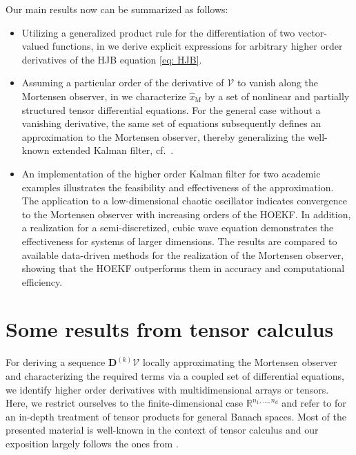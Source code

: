 \documentclass[11pt,reqno]{amsart}
\numberwithin{equation}{section}
\theoremstyle{plain}
\newcommand{\R}{\mathbb{R}}
\newcommand{\TenDeriv}[1]{\mathbf{D}^{(#1)}}
\begin{document}
Our main results now can be summarized as follows:
\begin{itemize}
    \item Utilizing a generalized product rule for the differentiation of two vector-valued functions, in  we derive explicit expressions for arbitrary higher order derivatives of the HJB equation \eqref{eq: HJB}.
    \item Assuming a particular order of the derivative of $\mathcal{V}$ to vanish along the Mortensen observer, in  we characterize $\widehat{x}_\mathrm{M}$ by a set of nonlinear and partially structured tensor differential equations. For the general case without a vanishing derivative, the same set of equations subsequently defines an approximation to the Mortensen observer, thereby generalizing the well-known extended Kalman filter, cf.~.
    \item An implementation of the higher order Kalman filter for two academic examples illustrates the feasibility and effectiveness of the approximation. The application to a low-dimensional chaotic oscillator indicates convergence to the Mortensen observer with increasing orders of the HOEKF. In addition, a realization for a semi-discretized, cubic wave equation demonstrates the effectiveness for systems of larger dimensions. The results are compared to available data-driven methods for the realization of the Mortensen observer, showing that the HOEKF outperforms them in accuracy and computational efficiency.  
\end{itemize}
%
\section{Some results from tensor calculus}
%
For deriving a sequence $\TenDeriv{k} \mathcal{V}$ locally approximating the Mortensen observer and characterizing the required terms via a coupled set of differential equations, we identify higher order derivatives with multidimensional arrays or tensors. Here, we restrict ourselves to the finite-dimensional case $\R^{n_1,\dots,n_d}$ and refer to \cite{Hac19} for an in-depth treatment of tensor products for general Banach spaces. Most of the presented material is well-known in the context of tensor calculus and our exposition largely follows the ones from \cite{Wol19,Sal22}.
\end{document}
